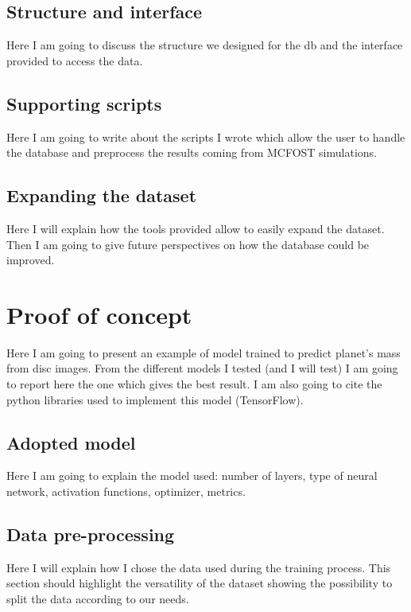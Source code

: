 \documentclass[a4paper,10pt]{report}
\begin{document}
\section{Structure and interface}

Here I am going to discuss the structure we designed for the db and the interface provided to 
access the data.

\section{Supporting scripts}

Here I am going to write about the scripts I wrote which allow the user to handle the database
and preprocess the results coming from MCFOST simulations.

\section{Expanding the dataset}

Here I will explain how the tools provided allow to easily expand the dataset. 
Then I am going to give future perspectives on how the database could be improved.

\chapter{Proof of concept}

Here I am going to present an example of model trained to predict planet's mass from 
disc images.
From the different models I tested (and I will test)
I am going to report here the one which gives the best result.
I am also going to cite the python libraries used to implement this model (TensorFlow).

\section{Adopted model}

Here I am going to explain the model used: number of layers, type of neural network, activation functions,
optimizer, metrics.

\section{Data pre-processing}

Here I will explain how I chose the data used during the training process.
This section should highlight the versatility of the dataset showing the possibility to split the 
data according to our needs.
\end{document}
